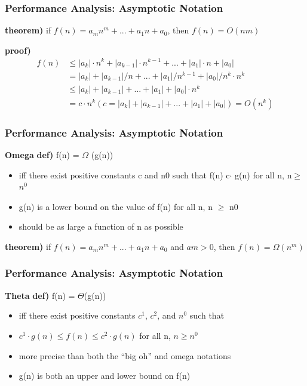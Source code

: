 \documentclass[newPxFont,sthlmFooter,nooffset]{beamer}
\begin{document}
\begin{frame}[t]
  \frametitle{Performance Analysis: Asymptotic Notation}
\textbf{theorem)} if $f(n) = a_{m}n^m + ... + a_1n + a_0$, then $f(n) = O(nm)$

\textbf{proof)}
\begin{align*}
f(n) &\leq  |a_k|·n^k + |a_{k-1}|·n^{k-1} +...+ |a_1|\cdot n + |a_0| \\
& = {|a_k| + |a_{k-1}|/n +...+ |a_1|/n^{k-1}+ |a_0|/n^k}\cdot n^k \\
& \leq  {|a_k| + |a_{k-1}| +...+ |a_1| + |a_0|}\cdot n^k \\
& = c\cdot n^k (c = |a_k|+|a_{k-1}|+...+|a_1|+|a_0|) = O(n^k)
\end{align*}
\end{frame}


\begin{frame}[t]
  \frametitle{Performance Analysis: Asymptotic Notation}
\textbf{Omega}
\textbf{def)} f(n) = $\Omega$ (g(n))
\begin{itemize}
\item iff there exist positive constants c and n0 such that f(n)
  c$\cdot$ g(n) for all n, n$\geq$ $n^0$
\end{itemize}


\begin{itemize}
\item g(n) is a lower bound on the value of f(n) for all n, n $\geq$ n0
\item should be as large a function of n as possible
\end{itemize}

\textbf{theorem)} if $f(n) = a_mn^m + ... + a_1n + a_0$ and $am > 0$, then $f(n) = \Omega(n^m)$
\end{frame}

\begin{frame}[t]
  \frametitle{Performance Analysis: Asymptotic Notation}
\textbf{  Theta}
\textbf{def)} f(n) =  $\Theta$(g(n))
\begin{itemize}
\item iff there exist positive constants $c^1$, $c^2$, and $n^0$ such that
\item $c^1\cdot g(n) \leq f(n) \leq c^2\cdot g(n)$ for all n, $n\geq n^0$
\end{itemize}

\begin{itemize}
\item  more precise than both the “big oh” and omega notations
\item g(n) is both an upper and lower bound on f(n)
\end{itemize}

\end{frame}
\end{document}
